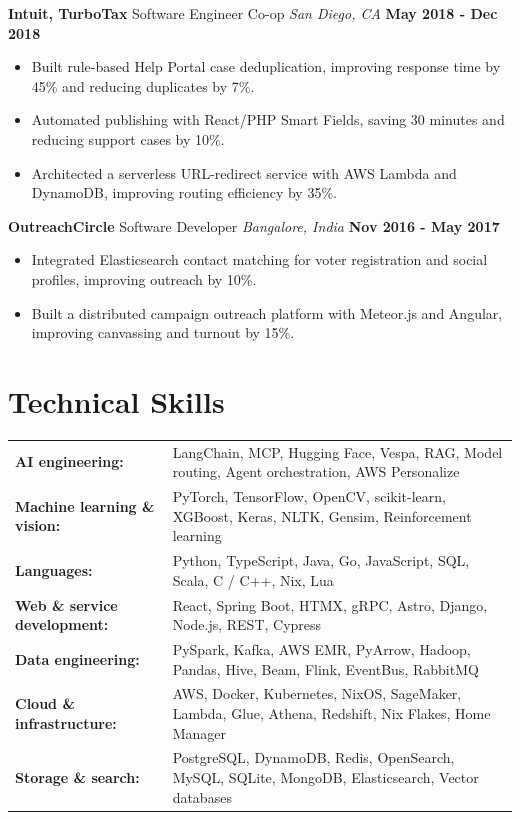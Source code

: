 \documentclass[10pt, letterpaper]{article}
\newcommand{\jobentry}[4]{
  \noindent\textbf{#1} \hfill #2 \hfill \textit{#3} \hfill \textbf{#4}
}
\begin{document}
\newpage
\jobentry{Intuit, TurboTax}{Software Engineer Co-op}{San Diego, CA}{May 2018 - Dec 2018}
\begin{itemize}
\item Built rule-based Help Portal case deduplication, improving response time by 45\% and reducing duplicates by 7\%.
\item Automated publishing with React/PHP Smart Fields, saving 30 minutes and reducing support cases by 10\%.
\item Architected a serverless URL-redirect service with AWS Lambda and DynamoDB, improving routing efficiency by 35\%.
\end{itemize}
\jobentry{OutreachCircle}{Software Developer}{Bangalore, India}{Nov 2016 - May 2017}
\begin{itemize}
\item Integrated Elasticsearch contact matching for voter registration and social profiles, improving outreach by 10\%.
\item Built a distributed campaign outreach platform with Meteor.js and Angular, improving canvassing and turnout by 15\%.
\end{itemize}

\section{Technical Skills}
\begin{tabularx}{\textwidth}{@{} l X @{}}
\textbf{AI engineering:} & LangChain, MCP, Hugging Face, Vespa, RAG, Model routing, Agent orchestration, AWS Personalize \\
\textbf{Machine learning \& vision:} & PyTorch, TensorFlow, OpenCV, scikit-learn, XGBoost, Keras, NLTK, Gensim, Reinforcement learning \\
\textbf{Languages:} & Python, TypeScript, Java, Go, JavaScript, SQL, Scala, C / C++, Nix, Lua \\
\textbf{Web \& service development:} & React, Spring Boot, HTMX, gRPC, Astro, Django, Node.js, REST, Cypress \\
\textbf{Data engineering:} & PySpark, Kafka, AWS EMR, PyArrow, Hadoop, Pandas, Hive, Beam, Flink, EventBus, RabbitMQ \\
\textbf{Cloud \& infrastructure:} & AWS, Docker, Kubernetes, NixOS, SageMaker, Lambda, Glue, Athena, Redshift, Nix Flakes, Home Manager \\
\textbf{Storage \& search:} & PostgreSQL, DynamoDB, Redis, OpenSearch, MySQL, SQLite, MongoDB, Elasticsearch, Vector databases \\
\end{tabularx}
\end{document}
